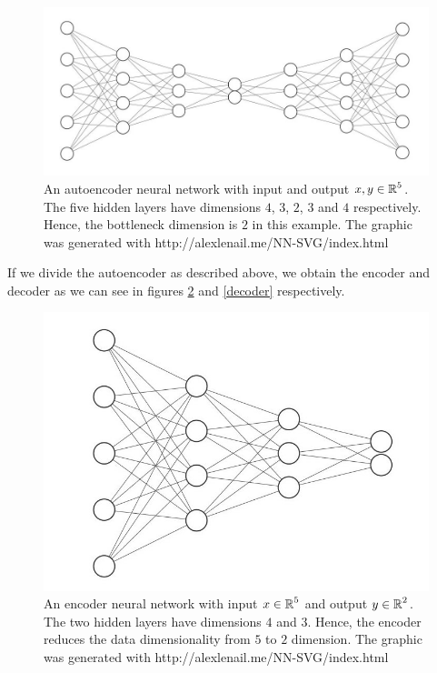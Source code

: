 \begin{figure}[H]
\begin{center}
   \begin{minipage}[b]{\linewidth}
      \includegraphics[width=\linewidth]{autoencoder}
      \caption{An autoencoder neural network with input and output $x, y\in \operatorname{\mathbb{R}}^5$. The five hidden layers have dimensions $4$, $3$, $2$, $3$ and $4$ respectively. Hence, the bottleneck dimension is $2$ in this example. The graphic was generated with http://alexlenail.me/NN-SVG/index.html}\label{autoencoder}
	\end{minipage}
\end{center}
\end{figure}


If we divide the autoencoder as described above, we obtain the encoder and decoder as we can see in figures \ref{encoder} and \ref{decoder} respectively.


\begin{figure}[H]
\begin{center}
   \begin{minipage}[b]{\linewidth}
      \includegraphics[width=\linewidth]{encoder}
      \caption{An encoder neural network with input $x\in \operatorname{\mathbb{R}}^5$ and output $y \in \operatorname{\mathbb{R}}^2$. The two hidden layers have dimensions $4$ and $3$. Hence, the encoder reduces the data dimensionality from $5$ to $2$ dimension. The graphic was generated with http://alexlenail.me/NN-SVG/index.html}\label{encoder}
	\end{minipage}
\end{center}
\end{figure}


